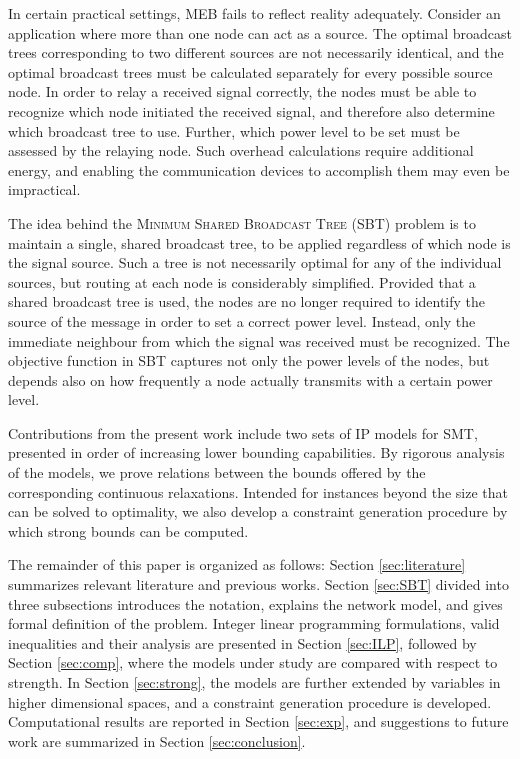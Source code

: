 In certain practical settings, MEB fails to reflect reality adequately.
Consider an application where more than one node can act as a source.
The optimal broadcast trees corresponding to two different sources are not necessarily identical,
and the optimal broadcast trees must be calculated separately for every possible source node.
In order to relay a received signal correctly, the nodes must be able to recognize which node initiated the received signal, and therefore also determine which broadcast tree to use.
Further, which power level to be set must be assessed by the relaying node.
Such overhead calculations require additional energy, and enabling the communication devices to accomplish them may even be impractical.

The idea behind the \textsc{Minimum Shared Broadcast Tree} (SBT) problem is to maintain a single, shared broadcast tree, to be applied regardless of which node is the signal source.
Such a tree is not necessarily optimal for any of the individual sources, but routing at each node is considerably simplified.
Provided that a shared broadcast tree is used, the nodes are no longer required to identify the source of the message in order to set a correct power level.
Instead, only the immediate neighbour from which the signal was received must be recognized.
The objective function in SBT captures not only the power levels of the nodes, but depends also on how frequently a node actually transmits with a certain power level.

Contributions from the present work include two sets of IP models for SMT, presented in order of increasing lower bounding capabilities.
By rigorous analysis of the models, we prove relations between the bounds offered by the corresponding continuous relaxations.
Intended for instances beyond the size that can be solved to optimality, we also develop a constraint generation procedure by which strong bounds can be computed.

The remainder of this paper is organized as follows: 
Section \ref{sec:literature} summarizes relevant literature and previous works.
Section \ref{sec:SBT} divided into three subsections introduces the notation, explains the network model, and gives formal definition of the problem.
Integer linear programming formulations, valid inequalities and their analysis are presented in Section \ref{sec:ILP},
followed by Section \ref{sec:comp}, where the models under study are compared with respect to strength.
In Section \ref{sec:strong}, the models are further extended by variables in higher dimensional spaces,
and a constraint generation procedure is developed.
Computational results are reported in Section \ref{sec:exp},
and suggestions to future work are summarized in Section \ref{sec:conclusion}.
